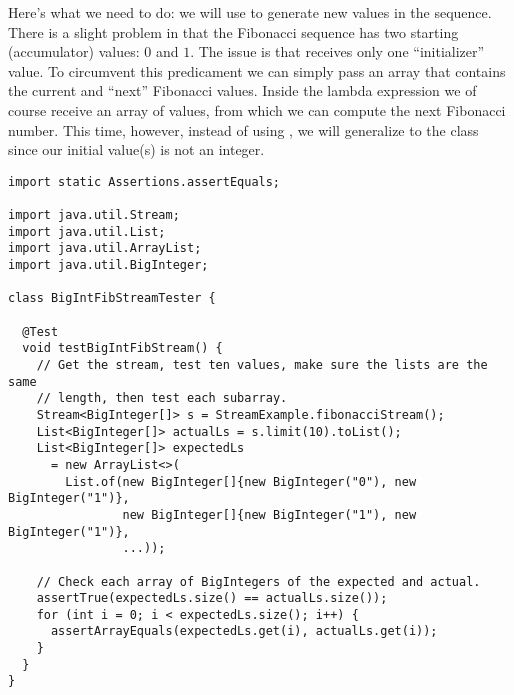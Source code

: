 
Here's what we need to do: we will use  to generate new values in the sequence. There is a slight problem in that the Fibonacci sequence has two starting (accumulator) values: $0$ and $1$. The issue is that  receives only one ``initializer'' value. To circumvent this predicament we can simply pass an array that contains the current and ``next'' Fibonacci values. Inside the lambda expression we of course receive an array of values, from which we can compute the next Fibonacci number. This time, however, instead of using , we will generalize to the  class since our initial value(s) is not an integer.

\begin{cl}[]{}
\begin{lstlisting}[language=MyJava]
import static Assertions.assertEquals;

import java.util.Stream;
import java.util.List;
import java.util.ArrayList;
import java.util.BigInteger;

class BigIntFibStreamTester {

  @Test
  void testBigIntFibStream() {
    // Get the stream, test ten values, make sure the lists are the same
    // length, then test each subarray.
    Stream<BigInteger[]> s = StreamExample.fibonacciStream();
    List<BigInteger[]> actualLs = s.limit(10).toList();
    List<BigInteger[]> expectedLs 
      = new ArrayList<>(
        List.of(new BigInteger[]{new BigInteger("0"), new BigInteger("1")},
                new BigInteger[]{new BigInteger("1"), new BigInteger("1")},
                ...));

    // Check each array of BigIntegers of the expected and actual.
    assertTrue(expectedLs.size() == actualLs.size());
    for (int i = 0; i < expectedLs.size(); i++) {
      assertArrayEquals(expectedLs.get(i), actualLs.get(i));
    }
  }
}
\end{lstlisting}
\end{cl}


